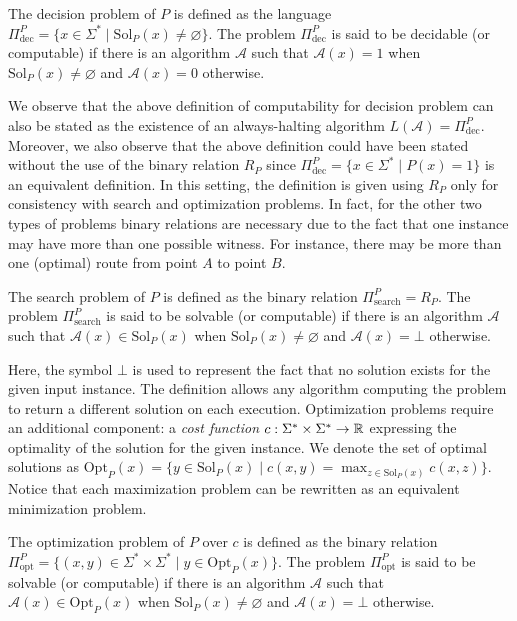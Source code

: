 \begin{definition}
  The decision problem of $P$ is defined as the language $\Pi_{\text{dec}}^P = \{x \in \Sigma^* \mid \mathrm{Sol}_P(x) \neq \varnothing\}$. The problem $\Pi_{\text{dec}}^P$ is said to be decidable (or computable) if there is an algorithm $\mathcal{A}$ such that $\mathcal{A}(x) = 1$ when $\mathrm{Sol}_P(x) \neq \varnothing$ and $\mathcal{A}(x) = 0$ otherwise.
\end{definition}

We observe that the above definition of computability for decision problem can also be stated as the existence of an always-halting algorithm $L(\mathcal{A}) =\Pi_{\text{dec}}^P$. Moreover, we also observe that the above definition could have been stated without the use of the binary relation $R_P$ since $\Pi_{\text{dec}}^P = \{x \in \Sigma^* \mid P(x) = 1\}$ is an equivalent definition. In this setting, the definition is given using $R_P$ only for consistency with search and optimization problems. In fact, for the other two types of problems binary relations are necessary due to the fact that one instance may have more than one possible witness. For instance, there may be more than one (optimal) route from point $A$ to point $B$.

\begin{definition}
  The search problem of $P$ is defined as the binary relation $\Pi_{\text{search}}^P = R_P$. The problem $\Pi_{\text{search}}^P$ is said to be solvable (or computable) if there is an algorithm $\mathcal{A}$ such that $\mathcal{A}(x) \in \mathrm{Sol}_P(x)$ when $\mathrm{Sol}_P(x) \neq \varnothing$ and $\mathcal{A}(x) = \bot$ otherwise.
\end{definition}

Here, the symbol $\bot$ is used to represent the fact that no solution exists for the given input instance. The definition allows any algorithm computing the problem to return a different solution on each execution. Optimization problems require an additional component: a \textit{cost function} $c : \Sigma^* \times \Sigma^* \to \mathbb{R}$ expressing the optimality of the solution for the given instance. We denote the set of optimal solutions as $\mathrm{Opt}_P(x) = \{y \in \mathrm{Sol}_P(x) \mid c(x,y) = \max_{z \in \mathrm{Sol}_P(x)} c(x,z)\}$. Notice that each maximization problem can be rewritten as an equivalent minimization problem. 

\begin{definition}
  The optimization problem of $P$ over $c$ is defined as the binary relation $\Pi_{\text{opt}}^P = \{(x,y) \in \Sigma^* \times \Sigma^* \mid y \in \mathrm{Opt}_P(x)\}$. The problem $\Pi_{\text{opt}}^P$ is said to be solvable (or computable) if there is an algorithm $\mathcal{A}$ such that $\mathcal{A}(x) \in \mathrm{Opt}_P(x)$ when $\mathrm{Sol}_P(x) \neq \varnothing$ and $\mathcal{A}(x) = \bot$ otherwise.
\end{definition}

